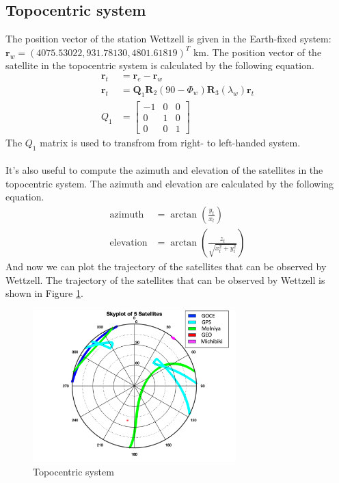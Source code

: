 \documentclass[12pt
,headinclude
,headsepline
,bibtotocnumbered
]{scrartcl}
\begin{document}
\subsection*{Topocentric system}
The position vector of the station Wettzell is given in the Earth-fixed system: $\boldsymbol{r}_w=(4075.53022, 931.78130, 4801.61819)^T$ km. The position vector of the satellite in the topocentric system is calculated by the following equation.
\begin{align*}
    \boldsymbol{r}_t&=\boldsymbol{r}_e-\boldsymbol{r}_w\\
    \boldsymbol{r}_t&=\boldsymbol{Q}_1\boldsymbol{R}_2(90-\Phi_w)\boldsymbol{R}_3(\lambda_w)\boldsymbol{r}_t\\
    Q_1&=\begin{bmatrix}
        -1&0&0\\
        0&1&0\\
        0&0&1
    \end{bmatrix}
\end{align*}
The $Q_1$ matrix is used to transfrom from right- to left-handed system. \\\\
It's also useful to compute the azimuth and elevation of the satellites in the topocentric system. The azimuth and elevation are calculated by the following equation.
\begin{align*}
    \text{azimuth}&=\arctan\left(\frac{y_t}{x_t}\right)\\
    \text{elevation}&=\arctan\left(\frac{z_t}{\sqrt{x_t^2+y_t^2}}\right)
\end{align*}
And now we can plot the trajectory of the satellites that can be observed by Wettzell. The trajectory of the satellites that can be observed by Wettzell is shown in Figure \ref{fig:topocentric}.
\begin{figure}[H]
    \centering
    \includegraphics[width=0.7\textwidth]{plots/topocentric.png}
    \caption{Topocentric system}
    \label{fig:topocentric}
\end{figure}
\end{document}
